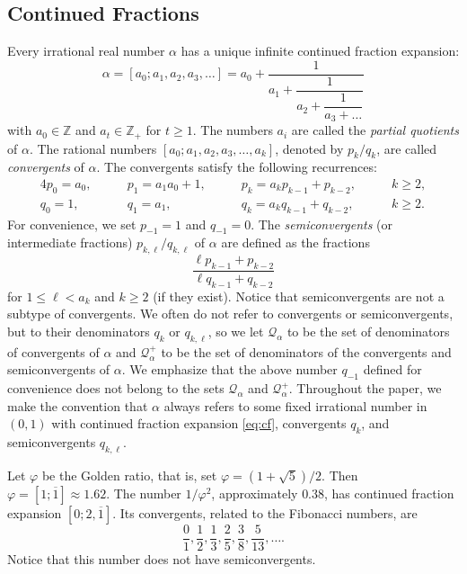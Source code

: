 \documentclass[a4paper,fleqn]{article}
\newcommand{\qk}[1]{\mathcal{Q}_{#1}}
\newcommand{\qkl}[1]{\mathcal{Q}^+_{#1}}
\newcommand{\Z}{\mathbb{Z}}
\begin{document}
  \subsection{Continued Fractions}
  Every irrational real number $\alpha$ has a unique infinite continued fraction expansion:
  \begin{equation}\label{eq:cf}
    \alpha = [a_0; a_1, a_2, a_3, \ldots] = a_0 + \dfrac{1}{a_1 + \dfrac{1}{a_2 + \dfrac{1}{a_3 + \ldots}}}
  \end{equation}
  with $a_0 \in \Z$ and $a_t \in \Z_+$ for $t \geq 1$. The numbers $a_i$ are called the \emph{partial
  quotients} of $\alpha$. The rational numbers $[a_0; a_1, a_2, a_3, \ldots, a_k]$, denoted by $p_k / q_k$, are called
  \emph{convergents} of $\alpha$. The convergents satisfy the following recurrences:
  \begin{alignat*}{4}
    p_0 = a_0, &\qquad p_1 = a_1 a_0 + 1, &\qquad p_k = a_k p_{k-1} + p_{k-2}, \qquad& k \geq 2, \\
    q_0 = 1,   &\qquad q_1 = a_1,         &\qquad q_k = a_k q_{k-1} + q_{k-2}, \qquad& k \geq 2.
  \end{alignat*}  
  For convenience, we set $p_{-1} = 1$ and $q_{-1} = 0$. The \emph{semiconvergents} (or intermediate fractions)
  $p_{k,\ell} / q_{k,\ell}$ of $\alpha$ are defined as the fractions
  \begin{equation*}
    \frac{ \ell p_{k-1} + p_{k-2} }{ \ell q_{k-1} + q_{k-2} }
  \end{equation*}
  for $1 \leq \ell < a_k$ and $k \geq 2$ (if they exist). Notice that semiconvergents are not a subtype of convergents.
  We often do not refer to convergents or semiconvergents, but to their denominators $q_k$ or $q_{k,\ell}$, so we let
  $\qk{\alpha}$ to be the set of denominators of convergents of $\alpha$ and $\qkl{\alpha}$ to be the set of
  denominators of the convergents and semiconvergents of $\alpha$. We emphasize that the above number $q_{-1}$ defined
  for convenience does not belong to the sets $\qk{\alpha}$ and $\qkl{\alpha}$. Throughout the paper, we make the
  convention that $\alpha$ always refers to some fixed irrational number in $(0, 1)$ with continued fraction expansion
  \eqref{eq:cf}, convergents $q_k$, and semiconvergents $q_{k,\ell}$.

  \begin{example}
    Let $\varphi$ be the Golden ratio, that is, set $\varphi = (1 + \sqrt{5})/2$. Then
    $\varphi = [1; \overline{1}] \approx 1.62$. The number $1/\varphi^2$, approximately $0.38$, has continued fraction
    expansion $[0; 2, \overline{1}]$. Its convergents, related to the Fibonacci numbers, are
    \begin{equation*}
      \frac{0}{1}, \frac{1}{2}, \frac{1}{3}, \frac{2}{5}, \frac{3}{8}, \frac{5}{13}, \ldots.
    \end{equation*}
    Notice that this number does not have semiconvergents.
  \end{example}
\end{document}
